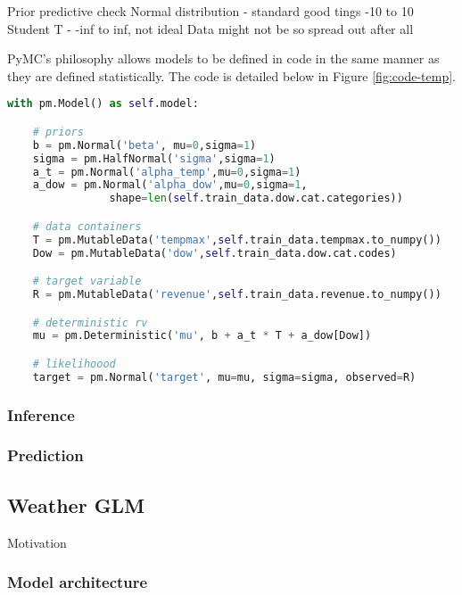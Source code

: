 Prior predictive check
  Normal distribution - standard good tings -10 to 10
  Student T - -inf to inf, not ideal 
  Data might not be so spread out after all

PyMC's philosophy allows models to be defined in code in the same manner as they are defined statistically.
The code is detailed below in Figure \ref{fig:code-temp}. 

\begin{lstlisting}[language=Python, caption=PyMC implementation of the Simple Temperature Model, label=fig:code-temp]
with pm.Model() as self.model:

    # priors
    b = pm.Normal('beta', mu=0,sigma=1)
    sigma = pm.HalfNormal('sigma',sigma=1)
    a_t = pm.Normal('alpha_temp',mu=0,sigma=1)
    a_dow = pm.Normal('alpha_dow',mu=0,sigma=1,
                shape=len(self.train_data.dow.cat.categories))

    # data containers
    T = pm.MutableData('tempmax',self.train_data.tempmax.to_numpy())
    Dow = pm.MutableData('dow',self.train_data.dow.cat.codes)

    # target variable
    R = pm.MutableData('revenue',self.train_data.revenue.to_numpy())

    # deterministic rv
    mu = pm.Deterministic('mu', b + a_t * T + a_dow[Dow])

    # likelihoood 
    target = pm.Normal('target', mu=mu, sigma=sigma, observed=R)

\end{lstlisting}

\subsubsection{Inference}

\subsubsection{Prediction}

\subsection{Weather GLM}

Motivation

\subsubsection{Model architecture}


